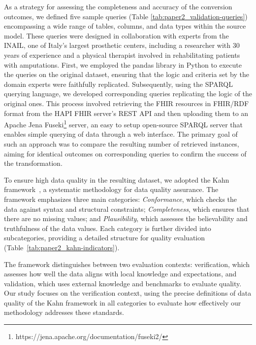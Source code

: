 As a strategy for assessing the completeness and accuracy of the conversion outcomes, we defined five sample queries (Table \ref{tab:paper2_validation-queries}) encompassing a wide range of tables, columns, and data types within the source model. These queries were designed in collaboration with experts from the INAIL, one of Italy's largest prosthetic centers, including a researcher with 30 years of experience and a physical therapist involved in rehabilitating patients with amputations. 
First, we employed the pandas library in Python to execute the queries on the original dataset, ensuring that the logic and criteria set by the domain experts were faithfully replicated. Subsequently, using the SPARQL querying language, we developed corresponding queries replicating the logic of the original ones. This process involved retrieving the FHIR resources in FHIR/RDF format from the HAPI FHIR server's REST API and then uploading them to an Apache Jena Fuseki\footnote{https://jena.apache.org/documentation/fuseki2/} server, an easy to setup open-source SPARQL server that enables simple querying of data through a web interface. The primary goal of such an approach was to compare the resulting number of retrieved instances, aiming for identical outcomes on corresponding queries to confirm the success of the transformation. 

To ensure high data quality in the resulting dataset, we adopted the Kahn framework~\cite{kahn_harmonized_2016}, a systematic methodology for data quality assurance. The framework emphasizes three main categories: \textit{Conformance}, which checks the data against syntax and structural constraints; \textit{Completeness}, which ensures that there are no missing values; and \textit{Plausibility}, which assesses the believability and truthfulness of the data values. Each category is further divided into subcategories, providing a detailed structure for quality evaluation (Table~\ref{tab:paper2_kahn-indicators}).

The framework distinguishes between two evaluation contexts: verification, which assesses how well the data aligns with local knowledge and expectations, and validation, which uses external knowledge and benchmarks to evaluate quality. Our study focuses on the verification context, using the precise definitions of data quality of the Kahn framework in all categories to evaluate how effectively our methodology addresses these standards.


